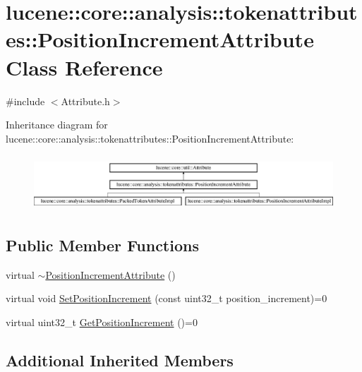 \hypertarget{classlucene_1_1core_1_1analysis_1_1tokenattributes_1_1PositionIncrementAttribute}{}\section{lucene\+:\+:core\+:\+:analysis\+:\+:tokenattributes\+:\+:Position\+Increment\+Attribute Class Reference}
\label{classlucene_1_1core_1_1analysis_1_1tokenattributes_1_1PositionIncrementAttribute}


{\ttfamily \#include $<$Attribute.\+h$>$}

Inheritance diagram for lucene\+:\+:core\+:\+:analysis\+:\+:tokenattributes\+:\+:Position\+Increment\+Attribute\+:\begin{figure}[H]
\begin{center}
\leavevmode
\includegraphics[height=2.084367cm]{classlucene_1_1core_1_1analysis_1_1tokenattributes_1_1PositionIncrementAttribute}
\end{center}
\end{figure}
\subsection*{Public Member Functions}
\begin{DoxyCompactItemize}
\item 
virtual \mbox{\hyperlink{classlucene_1_1core_1_1analysis_1_1tokenattributes_1_1PositionIncrementAttribute_ab97d9e510cff6c1014c283a59aac531c}{$\sim$\+Position\+Increment\+Attribute}} ()
\item 
virtual void \mbox{\hyperlink{classlucene_1_1core_1_1analysis_1_1tokenattributes_1_1PositionIncrementAttribute_a7d012852b01e0b16da72a911a90266b7}{Set\+Position\+Increment}} (const uint32\+\_\+t position\+\_\+increment)=0
\item 
virtual uint32\+\_\+t \mbox{\hyperlink{classlucene_1_1core_1_1analysis_1_1tokenattributes_1_1PositionIncrementAttribute_af0c59c3fbf138881647e46f05468eb13}{Get\+Position\+Increment}} ()=0
\end{DoxyCompactItemize}
\subsection*{Additional Inherited Members}


